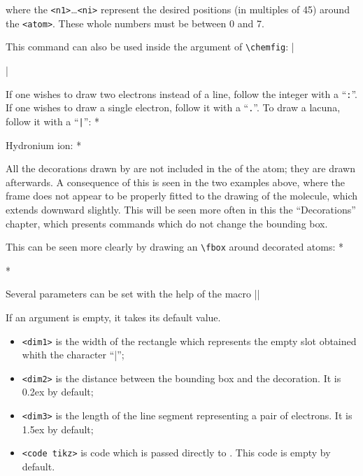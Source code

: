 \documentclass[10pt]{article}
\begin{document}
where the \verb-<n1>-\dots\verb-<ni>- represent the desired positions (in multiples of 45\degres) around the \verb-<atom>-. These whole numbers must be between 0 and 7.

This command can also be used inside the argument of \verb-\chemfig-\idx*{\lewis}:
|\par\medskip
	\par\medskip
	|

If one wishes to draw two electrons instead of a line, follow the integer with a ``\verb-:-''. If one wishes to draw a single electron, follow it with a ``\verb-.-''. To draw a lacuna, follow it with a ``\verb-|-''\idx*{\lewis}:
*\qquad{}\par\bigskip
	\qquad{}\par\bigskip
	\par\bigskip
	Hydronium ion: *

All the decorations drawn by \idx{\lewis} are not included in the  of the atom; they are drawn afterwards. A consequence of this is seen in the two examples above, where the frame does not appear to be properly fitted to the drawing of the molecule, which extends downward slightly. This will be seen more often in this the ``Decorations'' chapter, which presents commands which do not change the bounding box.

This can be seen more clearly by drawing an \verb-\fbox- around decorated atoms\idx*{\lewis}:
*
	\par\medskip
	*

\label{setlewis}Several parameters can be set with the help of the macro\idx*{\setlewis}
\centerverb||
\smallskip

If an argument is empty, it takes its default value.
\begin{itemize}
	\item \verb-<dim1>- is the width of the rectangle which represents the empty slot obtained whith the character ``|'';
	\item \verb-<dim2>- is the distance between the bounding box and the decoration. It is 0.2ex by default;
	\item \verb-<dim3>- is the length of the line segment representing a pair of electrons. It is 1.5ex by default;
	\item \verb-<code tikz>- is code which is passed directly to \TIKZ. This code is empty by default.
\end{itemize}
\end{document}
